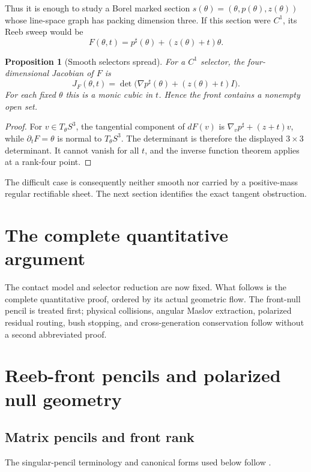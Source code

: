 \documentclass[10pt]{article}
\newtheorem{proposition}[theorem]{Proposition}
\begin{document}
Thus it is enough to study a Borel marked section
$s(\theta)=(\theta,p(\theta),z(\theta))$ whose line-space graph has packing dimension three.
If this section were $C^1$, its Reeb sweep would be
\[
 F(\theta,t)=p^\sharp(\theta)+(z(\theta)+t)\theta.
\]

\begin{proposition}[Smooth selectors spread]
\label{prop:smooth}
For a $C^1$ selector, the four-dimensional Jacobian of $F$ is
\[
 J_F(\theta,t)=\det\bigl(\nabla p^\sharp(\theta)+(z(\theta)+t)I\bigr).
\]
For each fixed $\theta$ this is a monic cubic in $t$. Hence the front contains a nonempty
open set.
\end{proposition}

\begin{proof}
For $v\in T_\theta S^3$, the tangential component of $dF(v)$ is
$\nabla_vp^\sharp+(z+t)v$, while $\partial_tF=\theta$ is normal to $T_\theta S^3$.
The determinant is therefore the displayed $3\times3$ determinant. It cannot vanish for all
$t$, and the inverse function theorem applies at a rank-four point.
\end{proof}

The difficult case is consequently neither smooth nor carried by a positive-mass regular
rectifiable sheet. The next section identifies the exact tangent obstruction.

\clearpage
\section*{The complete quantitative argument}
The contact model and selector reduction are now fixed.  What follows is the complete
quantitative proof, ordered by its actual geometric flow.  The front-null pencil is treated
first; physical collisions, angular Maslov extraction, polarized residual routing, bush
stopping, and cross-generation conservation follow without a second abbreviated proof.

\section{Reeb-front pencils and polarized null geometry}

\subsection{Matrix pencils and front rank}
The singular-pencil terminology and canonical forms used below follow
\cite{GohbergLancasterRodman2009,VanDooren1979,BergerTrenn2012}.
\end{document}
